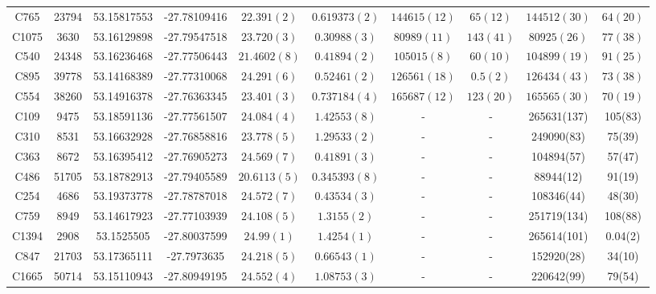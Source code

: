 \documentclass[12pt, twocolumn, nofootinbib]{revtex4-1}    %
\begin{document}
\begin{table}
\begin{tabular}{c@{\hskip 10pt}c@{\hskip 10pt}c@{\hskip 10pt}c@{\hskip 10pt}c@{\hskip 10pt}c@{\hskip 10pt}c@{\hskip 10pt}c@{\hskip 10pt}c@{\hskip 10pt}c}
C765 & 23794 & 53.15817553 & -27.78109416 & $22.391(2)$ & $0.619373(2)$ & $144615(12)$ & $65(12)$ & $144512(30)$ & $ 64(20)$ \\ 

C1075 & 3630 & 53.16129898 & -27.79547518 & $23.720(3)$ & $0.30988(3)$ & $80989(11)$ & $143(41)$ & $80925(26)$ & $ 77(38)$ \\ 

C540 & 24348 & 53.16236468 & -27.77506443 & $21.4602(8)$ & $0.41894(2)$ & $105015(8)$ & $60(10)$ & $104899(19)$ & $ 91(25)$ \\ 

C895 & 39778 & 53.14168389 & -27.77310068 & $24.291(6)$ & $0.52461(2)$ & $126561(18)$ & $0.5(2)$ & $126434(43)$ & $ 73(38)$ \\ 

C554 & 38260 & 53.14916378 & -27.76363345 & $23.401(3)$ & $0.737184(4)$ & $165687(12)$ & $123(20)$ & $165565(30)$ & $ 70(19)$ \\

C109 & 9475 & 53.18591136 & -27.77561507 & $24.084(4)$ & $1.42553(8)$ & - & - & 265631(137) & 105(83) \\ 

C310 & 8531 & 53.16632928 & -27.76858816 & $23.778(5)$ & $1.29533(2)$ & - & - & 249090(83) & 75(39) \\ 

C363 & 8672 & 53.16395412 & -27.76905273 & $24.569(7)$ & $0.41891(3)$ & - & - & 104894(57) & 57(47) \\ 

C486 & 51705 & 53.18782913 & -27.79405589 & $20.6113(5)$ & $0.345393(8)$ & - & - & 88944(12) & 91(19) \\ 

C254 & 4686 & 53.19373778 & -27.78787018 & $24.572(7)$ & $0.43534(3)$ & - & - & 108346(44) & 48(30) \\ 

C759 & 8949 & 53.14617923 & -27.77103939 & $24.108(5)$ & $1.3155(2)$ & - & - & 251719(134) & 108(88) \\ 

C1394 & 2908 & 53.1525505 & -27.80037599 & $24.99(1)$ & $1.4254(1)$ & - & - & 265614(101) & 0.04(2) \\ 

C847 & 21703 & 53.17365111 & -27.7973635 & $24.218(5)$ & $0.66543(1)$ & - & - & 152920(28) & 34(10) \\ 

C1665 & 50714 & 53.15110943 & -27.80949195 & $24.552(4)$ & $1.08753(3)$ & - & - & 220642(99) & 79(54) \\ 


\end{tabular}
\end{table}
\end{document}
